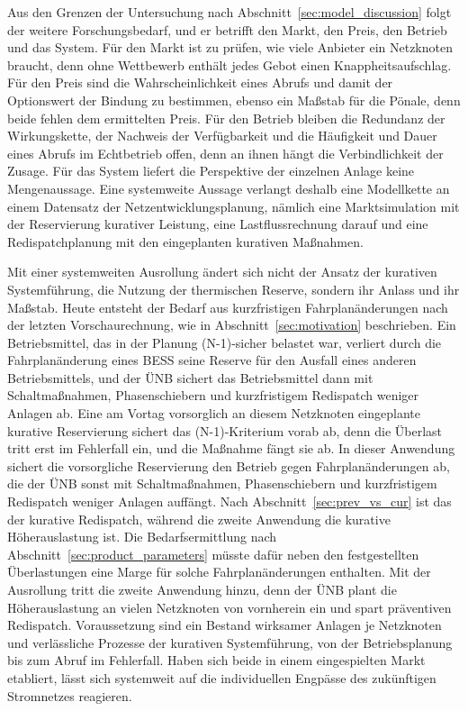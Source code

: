 Aus den Grenzen der Untersuchung nach Abschnitt~\ref{sec:model_discussion} folgt der weitere Forschungsbedarf, und er betrifft den Markt, den Preis, den Betrieb und das System.
Für den Markt ist zu prüfen, wie viele Anbieter ein Netzknoten braucht, denn ohne Wettbewerb enthält jedes Gebot einen Knappheitsaufschlag.
Für den Preis sind die Wahrscheinlichkeit eines Abrufs und damit der Optionswert der Bindung zu bestimmen, ebenso ein Maßstab für die Pönale, denn beide fehlen dem ermittelten Preis.
Für den Betrieb bleiben die Redundanz der Wirkungskette, der Nachweis der Verfügbarkeit und die Häufigkeit und Dauer eines Abrufs im Echtbetrieb offen, denn an ihnen hängt die Verbindlichkeit der Zusage.
Für das System liefert die Perspektive der einzelnen Anlage keine Mengenaussage.
Eine systemweite Aussage verlangt deshalb eine Modellkette an einem Datensatz der Netzentwicklungsplanung, nämlich eine Marktsimulation mit der Reservierung kurativer Leistung, eine Lastflussrechnung darauf und eine Redispatchplanung mit den eingeplanten kurativen Maßnahmen.

Mit einer systemweiten Ausrollung ändert sich nicht der Ansatz der kurativen Systemführung, die Nutzung der thermischen Reserve, sondern ihr Anlass und ihr Maßstab.
Heute entsteht der Bedarf aus kurzfristigen Fahrplanänderungen nach der letzten Vorschaurechnung, wie in Abschnitt~\ref{sec:motivation} beschrieben.
Ein Betriebsmittel, das in der Planung (N-1)-sicher belastet war, verliert durch die Fahrplanänderung eines \ac{BESS} seine Reserve für den Ausfall eines anderen Betriebsmittels, und der \ac{ÜNB} sichert das Betriebsmittel dann mit Schaltmaßnahmen, Phasenschiebern und kurzfristigem Redispatch weniger Anlagen ab.
Eine am Vortag vorsorglich an diesem Netzknoten eingeplante kurative Reservierung sichert das (N-1)-Kriterium vorab ab, denn die Überlast tritt erst im Fehlerfall ein, und die Maßnahme fängt sie ab.
In dieser Anwendung sichert die vorsorgliche Reservierung den Betrieb gegen Fahrplanänderungen ab, die der \ac{ÜNB} sonst mit Schaltmaßnahmen, Phasenschiebern und kurzfristigem Redispatch weniger Anlagen auffängt.
Nach Abschnitt~\ref{sec:prev_vs_cur} ist das der kurative Redispatch, während die zweite Anwendung die kurative Höherauslastung ist.
Die Bedarfsermittlung nach Abschnitt~\ref{sec:product_parameters} müsste dafür neben den festgestellten Überlastungen eine Marge für solche Fahrplanänderungen enthalten.
Mit der Ausrollung tritt die zweite Anwendung hinzu, denn der \ac{ÜNB} plant die Höherauslastung an vielen Netzknoten von vornherein ein und spart präventiven Redispatch.
Voraussetzung sind ein Bestand wirksamer Anlagen je Netzknoten und verlässliche Prozesse der kurativen Systemführung, von der Betriebsplanung bis zum Abruf im Fehlerfall. 
Haben sich beide in einem eingespielten Markt etabliert, lässt sich systemweit auf die individuellen Engpässe des zukünftigen Stromnetzes reagieren.